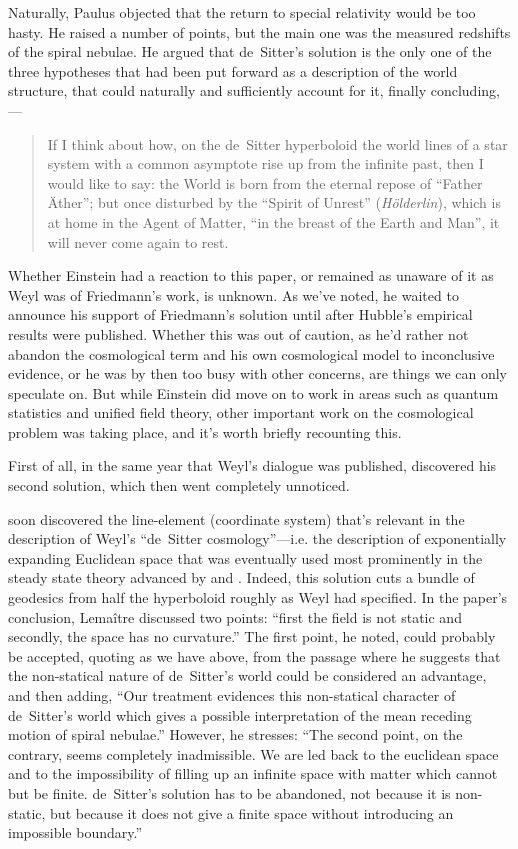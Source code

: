 \documentclass[12 pt]{article}
\begin{document}
Naturally, Paulus objected that the return to special relativity would be too hasty. He raised a number of points, but the main one was the measured redshifts of the spiral nebulae. He argued that de~Sitter's solution is the only one of the three hypotheses that had been put forward as a description of the world structure, that could naturally and sufficiently account for it, finally concluding,--- 
\begin{quote}
If I think about how, on the de~Sitter hyperboloid the world lines of a star system with a common asymptote rise up from the infinite past, then I would like to say: the World is born from the eternal repose of ``Father \"{A}ther''; but once disturbed by the ``Spirit of Unrest'' (\textit{H\"{o}lderlin}), which is at home in the Agent of Matter, ``in the breast of the Earth and Man'', it will never come again to rest.
\end{quote}

Whether Einstein had a reaction to this paper, or remained as unaware of it as Weyl was of Friedmann's work, is unknown. As we've noted, he waited to announce his support of Friedmann's solution until after Hubble's empirical results were published. Whether this was out of caution, as he'd rather not abandon the cosmological term and his own cosmological model to inconclusive evidence, or he was by then too busy with other concerns, are things we can only speculate on. But while Einstein did move on to work in areas such as quantum statistics and unified field theory, other important work on the cosmological problem was taking place, and it's worth briefly recounting this.

First of all, in the same year that Weyl's dialogue was published, \citet{Friedmann1924} discovered his second solution, which then went completely unnoticed.

\citet{Lemaitre1925} soon discovered the line-element (coordinate system) that's relevant in the description of Weyl's ``de~Sitter cosmology''---i.e. the description of exponentially expanding Euclidean space that was eventually used most prominently in the steady state theory advanced by \citet{Hoyle1948} and \citet{Bondi1948}. Indeed, this solution cuts a bundle of geodesics from half the hyperboloid roughly as Weyl had specified. In the paper's conclusion, Lema\^{i}tre discussed two points: ``first the field is not static and secondly, the space has no curvature.'' The first point, he noted, could probably be accepted, quoting \citet{Eddington1923} as we have above, from the passage where he suggests that the non-statical nature of de~Sitter's world could be considered an advantage, and then adding, ``Our treatment evidences this non-statical character of de~Sitter's world which gives a possible interpretation of the mean receding motion of spiral nebulae.'' However, he stresses: ``The second point, on the contrary, seems completely inadmissible. We are led back to the euclidean space and to the impossibility of filling up an infinite space with matter which cannot but be finite. de~Sitter's solution has to be abandoned, not because it is non-static, but because it does not give a finite space without introducing an impossible boundary.''
\end{document}
